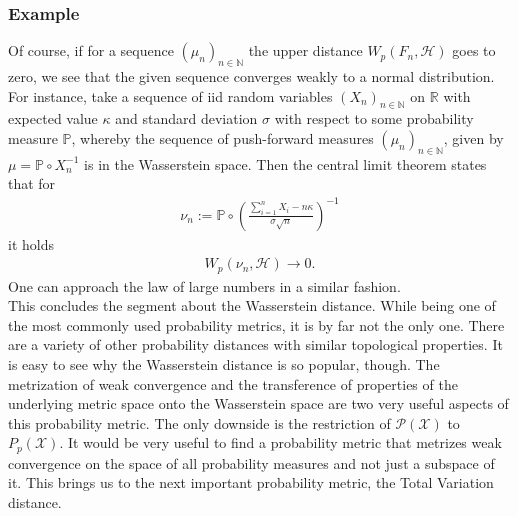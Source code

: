 \documentclass[11pt,a4paper]{article}
\begin{document}
\subsubsection{Example}
Of course, if for a sequence $(\mu_n)_{n\in\mathbb{N}}$ the upper distance $W_p(F_n,\mathcal{H})$ goes to zero, we see that the given sequence converges weakly to a normal distribution. \\
For instance, take a sequence of iid random variables $(X_n)_{n\in\mathbb{N}}$ on $\mathbb{R}$ with expected value $\kappa$ and standard deviation $\sigma$ with respect to some probability measure $\mathbb{P}$, whereby the sequence of push-forward measures $(\mu_n)_{n\in\mathbb{N}}$, given by $\mu=\mathbb{P}\circ{}X_n^{-1}$ is in the Wasserstein space. Then the central limit theorem states that for 
\begin{align*}
\nu_n:=\mathbb{P}\circ\left(\frac{\sum\limits_{i=1}^{n}X_i-n\kappa}{\sigma\sqrt{n}}\right)^{-1}
\end{align*}
it holds  
\begin{align*}
W_p(\nu_n,\mathcal{H})\longrightarrow{}0.
\end{align*}
One can approach the law of large numbers in a similar fashion.\vspace{1em}\\
This concludes the segment about the Wasserstein distance. While being one of the most commonly used probability metrics, it is by far not the only one. There are a variety of other probability distances with similar topological properties. It is easy to see why the Wasserstein distance is so popular, though. The metrization of weak convergence and the transference of properties of the underlying metric space onto the Wasserstein space are two very useful aspects of this probability metric. The only downside is the restriction of $\mathcal{P(X)}$ to $P_p(\mathcal{X})$. It would be very useful to find a probability metric that metrizes weak convergence on the space of all probability measures and not just a subspace of it. This brings us to the next important probability metric, the Total Variation distance.
\end{document}
